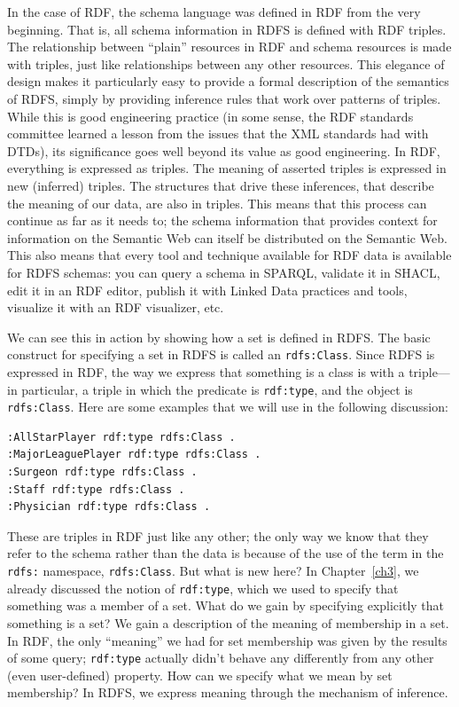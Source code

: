 In the case of RDF, the schema language was defined in RDF from the very
beginning. That is, all schema information in RDFS is defined with RDF
triples. The relationship between ``plain'' resources in RDF and schema
resources is made with triples, just like relationships between any
other resources. This elegance of design makes it particularly easy to
provide a formal description of the semantics of RDFS, simply by
providing inference rules that work over patterns of triples. While this
is good engineering practice (in some sense, the RDF standards committee
learned a lesson from the issues that the XML standards had with DTDs),
its significance goes well beyond its value as good engineering. In RDF,
everything is expressed as triples. The meaning of asserted triples is
expressed in new (inferred) triples. The structures that drive these
inferences, that describe the meaning of our data, are also in triples.
This means that this process can continue as far as it needs to; the
schema information that provides context for information on the Semantic
Web can itself be distributed on the Semantic Web. This also means that
every tool and technique available for RDF data is available for RDFS
schemas: you can query a schema in SPARQL, validate it in SHACL, edit
it in an RDF editor, publish it with Linked Data practices and tools,
visualize it with an RDF visualizer, etc.

We can see this in action by showing how a set is defined in RDFS. The
basic construct for specifying a set in RDFS is called an \texttt{rdfs:Class}.
Since RDFS is expressed in RDF, the way we express that something is a
class is with a triple---in particular, a triple in which the predicate
is \texttt{rdf:type}, and the object is \texttt{rdfs:Class}. Here are some examples that
we will use in the following discussion:

\begin{lstlisting}
:AllStarPlayer rdf:type rdfs:Class .
:MajorLeaguePlayer rdf:type rdfs:Class .
:Surgeon rdf:type rdfs:Class .
:Staff rdf:type rdfs:Class .
:Physician rdf:type rdfs:Class .
\end{lstlisting}

These are triples in RDF just like any other; the only way we know that
they refer to the schema rather than the data is because of the use of
the term in the \texttt{rdfs:} namespace, \texttt{rdfs:Class}. But what is new here? In
Chapter~\ref{ch3}, we already discussed the notion of \texttt{rdf:type}, which we used to
specify that something was a member of a set. What do we gain by
specifying explicitly that something is a set? We gain a description of
the meaning of membership in a set. In RDF, the only ``meaning'' we had
for set membership was given by the results of some query; \texttt{rdf:type}
actually didn't behave any differently from any other (even
user-defined) property. How can we specify what we mean by set
membership? In RDFS, we express meaning through the mechanism of
inference.

